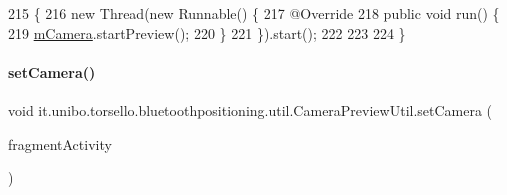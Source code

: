 \begin{DoxyCode}
215                               \{
216         \textcolor{keyword}{new} Thread(\textcolor{keyword}{new} Runnable() \{
217             @Override
218             \textcolor{keyword}{public} \textcolor{keywordtype}{void} run() \{
219                 \hyperlink{classit_1_1unibo_1_1torsello_1_1bluetoothpositioning_1_1util_1_1CameraPreviewUtil_a7ee402da8ec64412f9a68e68b4025eea_a7ee402da8ec64412f9a68e68b4025eea}{mCamera}.startPreview();
220             \}
221         \}).start();
222 
223 
224     \}
\end{DoxyCode}
\hypertarget{classit_1_1unibo_1_1torsello_1_1bluetoothpositioning_1_1util_1_1CameraPreviewUtil_acc49f348e381371fcad9d428ea4a15ca_acc49f348e381371fcad9d428ea4a15ca}{}\label{classit_1_1unibo_1_1torsello_1_1bluetoothpositioning_1_1util_1_1CameraPreviewUtil_acc49f348e381371fcad9d428ea4a15ca_acc49f348e381371fcad9d428ea4a15ca} 
\paragraph{\texorpdfstring{set\+Camera()}{setCamera()}}
{\footnotesize\ttfamily void it.\+unibo.\+torsello.\+bluetoothpositioning.\+util.\+Camera\+Preview\+Util.\+set\+Camera (\begin{DoxyParamCaption}\item[{Fragment\+Activity}]{fragment\+Activity }\end{DoxyParamCaption})}


